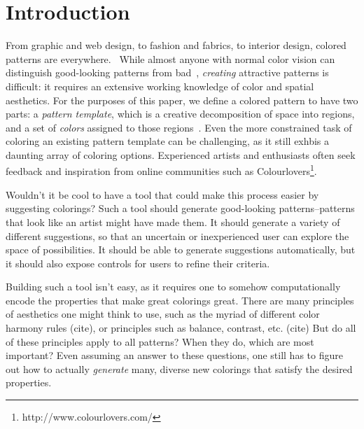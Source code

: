 \section{Introduction}
\label{sec:introduction}

From graphic and web design, to fashion and fabrics, to interior design, colored patterns are everywhere.~ While almost anyone with normal color vision can distinguish good-looking patterns from bad~, \emph{creating} attractive patterns is difficult: it requires an extensive working knowledge of color and spatial aesthetics. For the purposes of this paper, we define a colored pattern to have two parts: a \emph{pattern template}, which is a creative decomposition of space into regions, and a set of \emph{colors} assigned to those regions~. Even the more constrained task of coloring an existing pattern template can be challenging, as it still exhbis a daunting array of coloring options. Experienced artists and enthusiasts often seek feedback and inspiration from online communities such as Colourlovers\footnote{http://www.colourlovers.com/}.

Wouldn't it be cool to have a tool that could make this process easier by suggesting colorings? Such a tool should generate good-looking patterns--patterns that look like an artist might have made them. It should generate a variety of different suggestions, so that an uncertain or inexperienced user can explore the space of possibilities. It should be able to generate suggestions automatically, but it should also expose controls for users to refine their criteria.

Building such a tool isn't easy, as it requires one to somehow computationally encode the properties that make great colorings great. There are many principles of aesthetics one might think to use, such as the myriad of different color harmony rules (cite), or principles such as balance, contrast, etc. (cite) But do all of these principles apply to all patterns? When they do, which are most important? Even assuming an answer to these questions, one still has to figure out how to actually \emph{generate} many, diverse new colorings that satisfy the desired properties.

